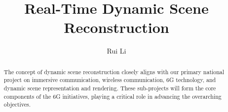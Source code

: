 \documentclass[lettersize,journal,onecolumn]{IEEEtran}
\begin{document}
\title{Real-Time Dynamic Scene Reconstruction}

\author{Rui Li}



\maketitle

\def\eg{\emph{e.g.}}
\def\Eg{\emph{E.g.}}
\def\etal{\emph{et al.}}

\newcommand\todo[1]{{\color{orange}TODO: #1}}
\newcommand\revised[1]{{\color{red}#1}}
\newcommand\idea[1]{{\color{blue}IDEA:#1}}
\newcommand\eqnref[1]{Eqn.~(\ref{#1})}
\newcommand\figref[1]{Fig.~(\ref{#1})}
\newcommand\secref[1]{Sec.~\ref{#1}}
\newcommand\tabref[1]{Tab.~\ref{#1}}

\newcommand{\T}{\mathbf{T}}
\newcommand{\svl}{\hat{\mathbf{s}}} %
\newcommand{\svg}{\mathbf{s}} %
\newcommand{\svt}{\mathbf{S}} %
\newcommand\mm[1]{\mathcal{#1}}
\newcommand\sv[1]{\mathcal{#1}}
\newcommand{\note}[1]{{\em{\textcolor{orange}{#1}}}}

\begin{abstract}
The concept of dynamic scene reconstruction closely aligns with our primary national project on immersive communication, wireless communication, 6G technology, and dynamic scene representation and rendering. These sub-projects will form the core components of the 6G initiatives, playing a critical role in advancing the overarching objectives.
\end{abstract}



%
%
%
%





%
%
%
%
%
%
%
%
%
%
%	
%	
\vfill
\end{document}
